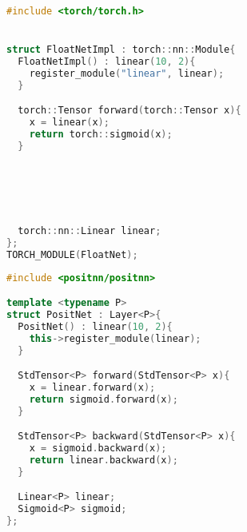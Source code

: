     \begin{multicols}{2}
        \begin{lstlisting}[language=C++, basicstyle=\scriptsize\ttfamily, frame=leftline]
#include <torch/torch.h>


struct FloatNetImpl : torch::nn::Module{
  FloatNetImpl() : linear(10, 2){ 
    register_module("linear", linear);
  }

  torch::Tensor forward(torch::Tensor x){
    x = linear(x);
    return torch::sigmoid(x);
  }

  
  
  
  
  
  torch::nn::Linear linear;
};
TORCH_MODULE(FloatNet);
        \end{lstlisting}
        \columnbreak
        \begin{lstlisting}[language=C++, basicstyle=\scriptsize\ttfamily, frame=leftline, tabsize=2]
#include <positnn/positnn>

template <typename P>
struct PositNet : Layer<P>{
  PositNet() : linear(10, 2){
    this->register_module(linear);
  }

  StdTensor<P> forward(StdTensor<P> x){
    x = linear.forward(x);
    return sigmoid.forward(x);
  }

  StdTensor<P> backward(StdTensor<P> x){
    x = sigmoid.backward(x);
    return linear.backward(x);
  }

  Linear<P> linear;
  Sigmoid<P> sigmoid;
};
        \end{lstlisting}
    \end{multicols}
